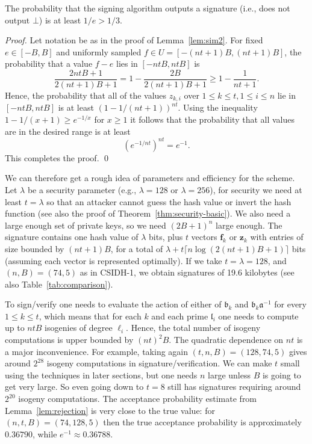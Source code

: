 \documentclass{llncs}
\renewcommand{\a}{\mathfrak{a}}
\renewcommand{\b}{\mathfrak{b}}
\renewcommand{\l}{\mathfrak{l}}
\newcommand{\f}{\mathbf{f}}
\newcommand{\z}{\mathbf{z}}
\begin{document}
\begin{lemma}\label{lem:rejection}
The probability that the signing algorithm outputs a signature (i.e., does not output $\bot$) is at least $1/e > 1/3$.
\end{lemma}

\begin{proof}
Let notation be as in the proof of Lemma~\ref{lem:sim2}.
For fixed $e \in [-B, B]$ and uniformly sampled $f \in U = [-(nt+1)B, (nt+1)B]$, the probability that a value $f-e$ lies in $[-ntB, ntB]$ is
\[
   \frac{2ntB + 1}{2(nt+1)B + 1}  = 1 - \frac{2B}{2(nt+1)B + 1} \ge 1 - \frac{1}{nt+1}.
\]
Hence, the probability that all of the values $z_{k,i}$ over $1 \le k \le t, 1 \le i \le n$ lie in $[-ntB, ntB]$ is at least $(1 - 1/(nt+1))^{nt}$.
Using the inequality $1 - 1/(x+1) \ge e^{-1/x}$ for $x \ge 1$ it follows that the probability that all values are in the desired range is at least
\[
   \left( e^{-1/nt} \right)^{nt} = e^{-1}.
\]
This completes the proof. \qed
\end{proof}





We can therefore get a rough idea of parameters and efficiency for the scheme.
Let $\lambda$ be a security parameter (e.g., $\lambda=128$ or $\lambda=256$), for security
we need at least $t=\lambda$ so that an attacker cannot guess the hash value or invert the hash function (see also the proof of Theorem~\ref{thm:security-basic}).
We also need a large enough set of private keys, so we need $(2B+1)^n$ large enough.
The signature contains one hash value of $\lambda$ bits, plus $t$ vectors $\f_k$ or $\z_k$ with entries of size bounded by $(nt+1)B$, for a total of $\lambda + t\lceil n\log(2(nt+1)B + 1)\rceil$ bits (assuming each vector is represented optimally). If we take $t=\lambda=128$, and $(n,B)=(74,5)$ as in CSIDH-1, we obtain signatures of 19.6 kilobytes (see also Table~\ref{tab:comparison}).

To sign/verify one needs to evaluate the action of either of $\b_k$ and $\b_k\a^{-1}$ for every $1\le k\le t$,
which means that for each $k$ and each prime $\l_i$ one needs to compute up to $ntB$ isogenies of degree $\ell_i$.
Hence, the total number of isogeny computations is upper bounded by $(nt)^2 B$.
The quadratic dependence on $nt$ is a major inconvenience.
For example, taking again $(t,n,B)=(128,74,5)$ gives around $2^{28}$ isogeny computations in signature/verification.
We can make $t$ small using the techniques in later sections, but one needs $n$ large unless $B$ is going to get very large. So even going down to $t=8$ still has signatures requiring around $2^{20}$ isogeny computations.
The acceptance probability estimate from Lemma~\ref{lem:rejection} is very close to the true value: for $(n,t,B)=(74,128,5)$ then the true acceptance probability is approximately $0.36790$, while $e^{-1} \approx 0.36788$.
\end{document}
